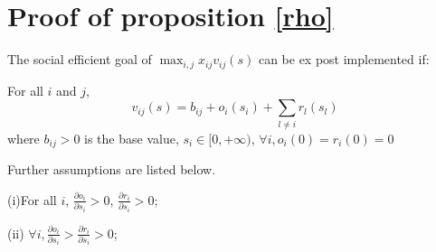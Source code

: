 
\chapter{Proof of proposition \ref{rho}} %

\label{Appendix_C} %
\begin{prop*}
  The social efficient goal of $\max_{i,j}x_{ij}v_{ij}(s)$ can be ex post implemented if:
  
For all $i$ and $j$,
$$v_{ij}(s)=b_{ij} + o_i(s_i) + \sum_{l \not = i} r_l(s_l) $$
where $b_{ij}>0$ is the base value, $s_i \in [0, + \infty)$, $\forall i,o_i(0)=r_i(0)=0$

Further assumptions are listed below.

(i)For all $i$, $\frac{\partial o_i}{\partial s_i} > 0$, $\frac{\partial r_i}{\partial s_i} > 0$;

(ii) $\forall i, \frac{\partial o_i}{\partial s_i}
> \frac{\partial r_i}{\partial s_i} > 0$;

\end{prop*}

